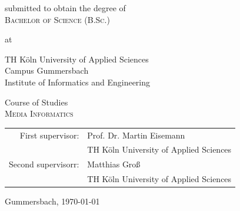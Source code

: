 \begin{titlepage}
\begin{center}
\vspace{1.0cm}

\begin{large}
submitted to obtain the degree of\\
\vspace{0.2cm}
\textsc{Bachelor of Science (B.Sc.)}\\ 
\end{large}

\vspace{0.4cm}

\begin{large}
at\\ 
\vspace{0.2cm}
\begin{scshape}
TH Köln University of Applied Sciences\\
Campus Gummersbach\\
Institute of Informatics and Engineering\\
\end{scshape}
\end{large}

\vspace{0.4cm}

\begin{large}
Course of Studies\\ 
\vspace{0.2cm}
\textsc{Media Informatics}
\end{large}


\vspace{1.0cm}

\begin{tabular}{rl}
        First supervisor:  &  Prof. Dr. Martin Eisemann\\
       					&  \small TH Köln University of Applied Sciences \\[1.0em]
       Second supervisorr:  &  Matthias Groß\\
       					&  \small TH Köln University of Applied Sciences\\
\end{tabular}

\vspace{0.6cm}

\begin{large}
Gummersbach, \today
\end{large}

\end{center}


\end{titlepage}
